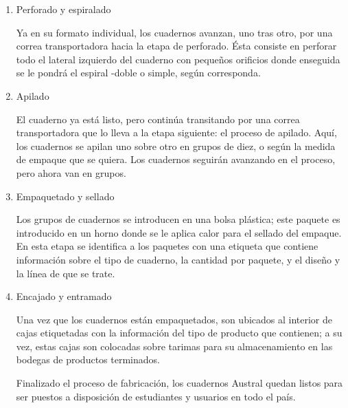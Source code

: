 \documentclass[a4paper]{article}
\begin{document}
\begin{enumerate}
\item Perforado y espiralado

Ya en su formato individual, los cuadernos avanzan, uno tras otro, por una correa transportadora hacia la etapa de perforado. Ésta consiste en perforar todo el lateral izquierdo del cuaderno con pequeños orificios donde enseguida se le pondrá el espiral -doble o simple, según corresponda.

\item Apilado

El cuaderno ya está listo, pero continúa transitando por una correa transportadora que lo lleva a la etapa siguiente: el proceso de apilado. Aquí, los cuadernos se apilan uno sobre otro en grupos de diez, o según la medida de empaque que se quiera. Los cuadernos seguirán avanzando en el proceso, pero ahora van en grupos.

\item Empaquetado y sellado

Los grupos de cuadernos se introducen en una bolsa plástica; este paquete es introducido en un horno donde se le aplica calor para el sellado del empaque. En esta etapa se identifica a los paquetes con una etiqueta que contiene información sobre el tipo de cuaderno, la cantidad por paquete, y el diseño y la línea de que se trate.

\item Encajado y entramado

Una vez que los cuadernos están empaquetados, son ubicados al interior de cajas etiquetadas con la información del tipo de producto que contienen; a su vez, estas cajas son colocadas sobre tarimas para su almacenamiento en las bodegas de productos terminados.

Finalizado el proceso de fabricación, los cuadernos Austral quedan listos para ser puestos a disposición de estudiantes y usuarios en todo el país.

\end{enumerate}
\large
\end{document}
